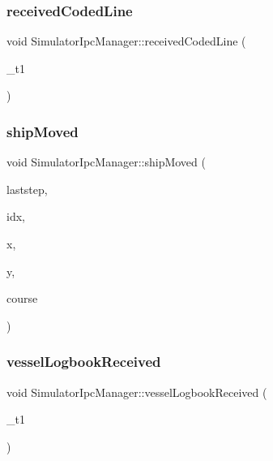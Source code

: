 \subsubsection{\texorpdfstring{receivedCodedLine}{receivedCodedLine}}
{\footnotesize\ttfamily void Simulator\+Ipc\+Manager\+::received\+Coded\+Line (\begin{DoxyParamCaption}\item[{Q\+String}]{\+\_\+t1 }\end{DoxyParamCaption})\hspace{0.3cm}{\ttfamily [signal]}}

\mbox{\label{class_simulator_ipc_manager_a68341f7f6daa4c81f1479ce1a03da5f8}} 
\subsubsection{\texorpdfstring{shipMoved}{shipMoved}}
{\footnotesize\ttfamily void Simulator\+Ipc\+Manager\+::ship\+Moved (\begin{DoxyParamCaption}\item[{int}]{laststep,  }\item[{int}]{idx,  }\item[{float}]{x,  }\item[{float}]{y,  }\item[{float}]{course }\end{DoxyParamCaption})\hspace{0.3cm}{\ttfamily [signal]}}

\mbox{\label{class_simulator_ipc_manager_ae4fa10519f329a23a6f7c92d03fa025c}} 
\subsubsection{\texorpdfstring{vesselLogbookReceived}{vesselLogbookReceived}}
{\footnotesize\ttfamily void Simulator\+Ipc\+Manager\+::vessel\+Logbook\+Received (\begin{DoxyParamCaption}\item[{\mbox{\hyperlink{class_vessel_stats}{Vessel\+Stats}}}]{\+\_\+t1 }\end{DoxyParamCaption})\hspace{0.3cm}{\ttfamily [signal]}}

